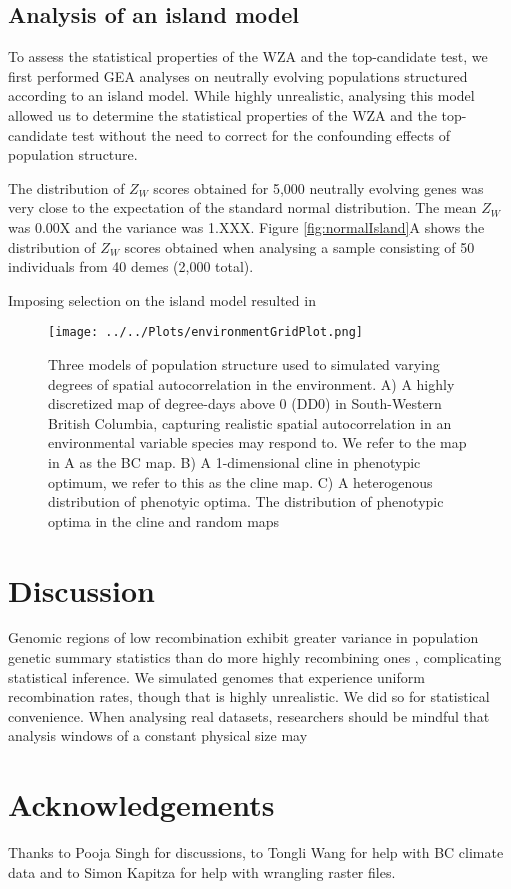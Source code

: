 \documentclass[11pt,twoside,lineno]{GSA_format}
\begin{document}
\subsection{Analysis of an island model}

To assess the statistical properties of the WZA and the top-candidate test, we first performed GEA analyses on neutrally evolving populations structured according to an island model. While highly unrealistic, analysing this model allowed us to determine the statistical properties of the WZA and the top-candidate test without the need to correct for the confounding effects of population structure. 

The distribution of $Z_W$ scores obtained for 5,000 neutrally evolving genes was very close to the expectation of the standard normal distribution. The mean $Z_W$ was 0.00X and the variance was 1.XXX. Figure \ref{fig:normalIsland}A shows the distribution of $Z_W$ scores obtained when analysing a sample consisting of 50 individuals from 40 demes (2,000 total). 

Imposing selection on the island model resulted in 

\begin{figure}
  \texttt{[image: ../../Plots/environmentGridPlot.png]}
  \caption{Three models of population structure used to simulated varying degrees of spatial autocorrelation in the environment. A) A highly discretized map of degree-days above 0 (DD0) in South-Western British Columbia, capturing realistic spatial autocorrelation in an environmental variable species may respond to. We refer to the map in A as the BC map. B) A 1-dimensional cline in phenotypic optimum, we refer to this as the cline map. C) A heterogenous distribution of phenotyic optima. The distribution of phenotypic optima in the cline and random maps}
  
  \label{fig:boat1}
\end{figure}

\section{Discussion}

Genomic regions of low recombination exhibit greater variance in population genetic summary statistics than do more highly recombining ones , complicating statistical inference. We simulated genomes that experience uniform recombination rates, though that is highly unrealistic. We did so for statistical convenience. When analysing real datasets, researchers should be mindful that analysis windows of a constant physical size may 


\section{Acknowledgements}

Thanks to Pooja Singh for discussions, to Tongli Wang for help with BC climate data and to Simon Kapitza for help with wrangling raster files. 



%
\end{document}
